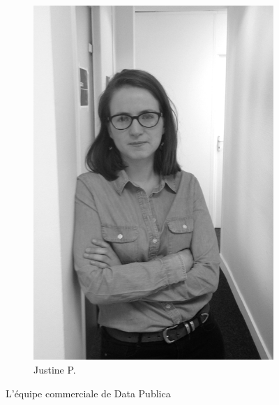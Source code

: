 \begin{figure}[h!]
\begin{subfigure}[b]{0.2\textwidth}
                \includegraphics[width=\textwidth]{images/Justine-serieuse-crop.jpg}
                \caption{Justine P.}
            \end{subfigure}
            \caption{L'équipe commerciale de Data Publica}
            \label{fig:teamc_data_publica}
        \end{figure}


